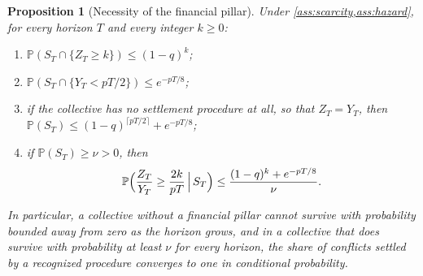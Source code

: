 \documentclass[11pt,letterpaper]{article}
\newtheorem{proposition}[theorem]{Proposition}
\theoremstyle{definition}
\theoremstyle{remark}
\newcommand{\Prob}{\mathbb{P}}
\begin{document}
\begin{proposition}[Necessity of the financial pillar]
\label{prop:financial-power:necessity}
Under \cref{ass:scarcity,ass:hazard}, for every horizon $T$ and every integer $k\geq 0$:
\begin{enumerate}
\item[(a)] $\Prob(S_T\cap\{Z_T\geq k\})\leq(1-q)^k$;
\item[(b)] $\Prob(S_T\cap\{Y_T<pT/2\})\leq e^{-pT/8}$;
\item[(c)] if the collective has no settlement procedure at all, so that $Z_T=Y_T$, then $\Prob(S_T)\leq(1-q)^{\lceil pT/2\rceil}+e^{-pT/8}$;
\item[(d)] if $\Prob(S_T)\geq\nu>0$, then
\[
\Prob\Bigl(\frac{Z_T}{Y_T}\geq\frac{2k}{pT}\,\Big|\,S_T\Bigr)\leq\frac{(1-q)^k+e^{-pT/8}}{\nu}.
\]
\end{enumerate}
In particular, a collective without a financial pillar cannot survive with probability bounded away from zero as the horizon grows, and in a collective that does survive with probability at least $\nu$ for every horizon, the share of conflicts settled by a recognized procedure converges to one in conditional probability.
\end{proposition}
\end{document}
